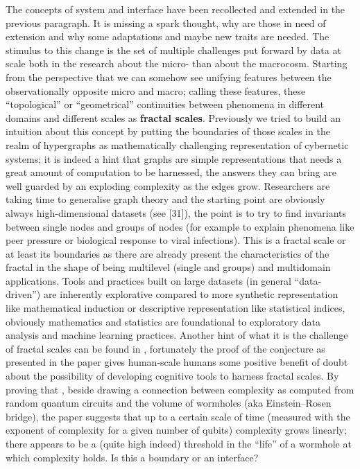 \documentclass[14pt,a4paper]{extarticle}
\begin{document}
\hspace*{15mm}The concepts of system and interface have been recollected and extended in the previous paragraph. It is missing a spark thought, why are those in need of extension and why some adaptations and maybe new traits are needed. The stimulus to this change is the set of multiple challenges put forward by data at scale both in the research about the micro- than about the macrocosm. Starting from the perspective that we can somehow see unifying features between the observationally opposite micro and macro; calling these features, these “topological” or “geometrical” continuities between phenomena in different domains and different scales as \textbf{fractal scales}. Previously we tried to build an intuition about this concept by putting the boundaries of those scales in the realm of hypergraphs as mathematically challenging representation of cybernetic systems; it is indeed a hint that graphs are simple representations that needs a great amount of computation to be harnessed, the answers they can bring are well guarded by an exploding complexity as the edges grow.
\newline
\hspace*{15mm}Researchers are taking time to generalise graph theory and the starting point are obviously always high-dimensional datasets (see [31]), the point is to try to find invariants between single nodes and groups of nodes (for example to explain phenomena like peer pressure or biological response to viral infections). This is a fractal scale or at least its boundaries as there are already present the characteristics of the fractal in the shape of being multilevel (single and groups) and multidomain applications. Tools and practices built on large datasets (in general “data-driven”) are inherently explorative compared to more synthetic representation like mathematical induction or descriptive representation like statistical indices, obviously mathematics and statistics are foundational to exploratory data analysis and machine learning practices.
\newline
\hspace*{15mm}Another hint of what it is the challenge of fractal scales can be found in \cite{haferkamp2022linear}, fortunately the proof of the conjecture as presented in the paper gives human-scale humans some positive benefit of doubt about the possibility of developing cognitive tools to harness fractal scales. By proving that , beside drawing a connection between complexity as computed from random quantum circuits and the volume of wormholes (aka Einstein–Rosen bridge), the paper suggests that up to a certain scale of time (measured with the exponent of complexity for a given number of qubits) complexity grows linearly; there appears to be a (quite high indeed) threshold in the “life” of a wormhole at which complexity holds. Is this a boundary or an interface?
\end{document}
